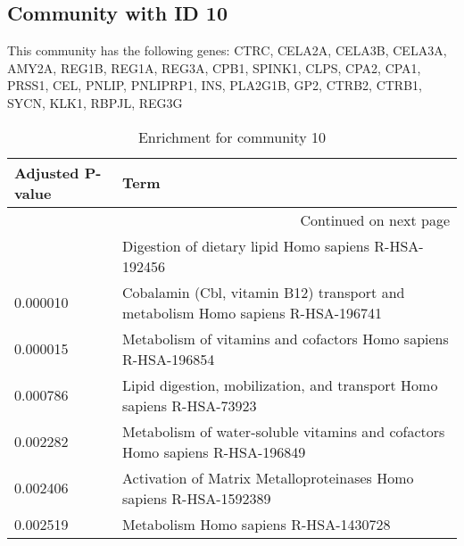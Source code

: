 \subsection*{Community with ID 10}
This community has the following genes: CTRC, CELA2A, CELA3B, CELA3A, AMY2A, REG1B, REG1A, REG3A, CPB1, SPINK1, CLPS, CPA2, CPA1, PRSS1, CEL, PNLIP, PNLIPRP1, INS, PLA2G1B, GP2, CTRB2, CTRB1, SYCN, KLK1, RBPJL, REG3G
\\
\begin{longtable}{p{2.4cm}p{14.5cm}}
\caption{Enrichment for community 10}\\
\toprule
Adjusted \newline P-value &                                                                             Term \\
\midrule
\endhead
\midrule
\multicolumn{2}{r}{{Continued on next page}} \\
\midrule
\endfoot

\bottomrule
\endlastfoot
                 0.000008 &                             Digestion of dietary lipid Homo sapiens R-HSA-192456 \\
                 0.000010 &  Cobalamin (Cbl, vitamin B12) transport and metabolism Homo sapiens R-HSA-196741 \\
                 0.000015 &                   Metabolism of vitamins and cofactors Homo sapiens R-HSA-196854 \\
                 0.000786 &            Lipid digestion, mobilization, and transport Homo sapiens R-HSA-73923 \\
                 0.002282 &     Metabolism of water-soluble vitamins and cofactors Homo sapiens R-HSA-196849 \\
                 0.002406 &               Activation of Matrix Metalloproteinases Homo sapiens R-HSA-1592389 \\
                 0.002519 &                                            Metabolism Homo sapiens R-HSA-1430728 \\
\end{longtable}


